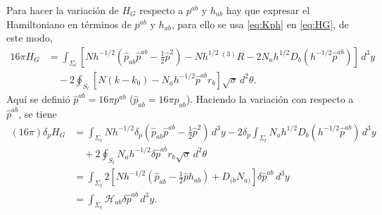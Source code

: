 Para hacer la variaci\'{o}n de $H_{G}$ respecto a $p^{ab}$ y $h_{ab}$ hay que expresar el Hamiltoniano en t\'{e}rminos de $p^{ab}$ y $h_{ab}$, para ello se usa \eqref{eq:Kph} en \eqref{eq:HG}, de este modo,
%
\begin{align}
\label{eq:16piHG}
16 \pi H_{G} & = \int_{\Sigma_{t}} \left[ N h^{-1/2} (\hat{p}_{ab} \hat{p}^{ab} - \frac{1}{2} \hat{p}^{2}) - N h^{1/2} \, ^{(3)}R - 2 N_{a} h^{1/2} D_{b} (h^{-1/2} \hat{p}^{ab}) \right] \, d^{3} y
\nonumber \\
& \quad - 2 \oint_{S_{t}} \left[ N (k - k_{0}) - N_{a} h^{-1/2} \hat{p}^{ab} r_{b} \right] \sqrt{\sigma} \, d^{2} \theta.
\end{align}
%
Aqu\'{i} se defini\'{o} $\hat{p}^{ab} = 16 \pi p^{ab}$ ($\hat{p}_{ab} = 16 \pi p_{ab}$). Haciendo la variaci\'{o}n con respecto a $\hat{p}^{ab}$, se tiene
%
\begin{align}
\label{eq:varHcrp}
(16 \pi) \delta_{p} H_{G} & = \int_{\Sigma_{t}} N h^{-1/2} \delta_{p}(\hat{p}_{ab} \hat{p}^{ab} - \frac{1}{2} \hat{p}^{2}) \, d^{3} y - 2 \delta_{p} \int_{\Sigma_{t}} N_{a} h^{1/2} D_{b} (h^{-1/2} \hat{p}^{ab}) \, d^{3} y \nonumber \\
& \quad + 2 \oint_{S_{t}} N_{a} h^{-1/2} \delta \hat{p}^{ab} r_{b} \sqrt{\sigma} \, d^{2} \theta \nonumber \\
& = \int_{\Sigma_{t}} 2 \left[ N h^{-1/2} (\hat{p}_{ab} - \frac{1}{2} \hat{p} h_{ab}) + D_{(b} N_{a)} \right] \delta \hat{p}^{ab} \, d^{3} y \nonumber \\
& = \int_{\Sigma_{t}} \mathcal{H}_{ab} \delta \hat{p}^{ab} \, d^{3} y.
\end{align}

